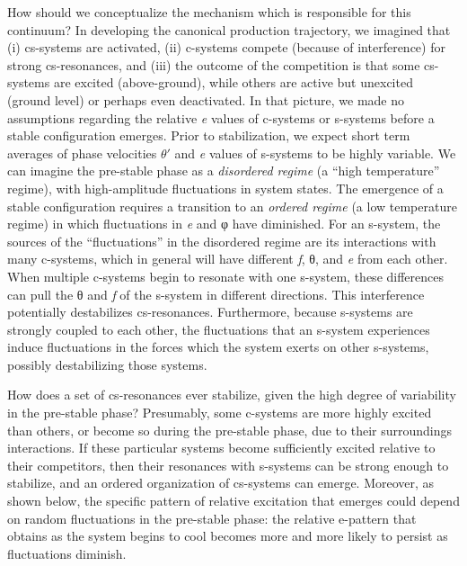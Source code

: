  How should we conceptualize the mechanism which is responsible for this continuum? In developing the canonical production trajectory, we imagined that (i) cs-systems are activated, (ii) c-systems compete (because of interference) for strong cs-resonances, and (iii) the outcome of the competition is that some cs-systems are excited (above-ground), while others are active but unexcited (ground level) or perhaps even deactivated. In that picture, we made no assumptions regarding the relative \textit{e} values of c-systems or s-systems before a stable configuration emerges. Prior to stabilization, we expect short term averages of phase velocities $\theta ′$ and \textit{e} values of s-systems to be highly variable. We can imagine the pre-stable phase as a \textit{disordered regime} (a “high temperature” regime), with high-amplitude fluctuations in system states. The emergence of a stable configuration requires a transition to an \textit{ordered regime} (a low temperature regime) in which fluctuations in \textit{e} and φ have diminished. For an s-system, the sources of the “fluctuations” in the disordered regime are its interactions with many c-systems, which in general will have different \textit{f}, θ, and \textit{e} from each other. When multiple c-systems begin to resonate with one s-system, these differences can pull the θ and \textit{f} of the s-system in different directions. This interference potentially destabilizes cs-resonances. Furthermore, because s-systems are strongly coupled to each other, the fluctuations that an s-system experiences induce fluctuations in the forces which the system exerts on other s-systems, possibly destabilizing those systems.

  How does a set of cs-resonances ever stabilize, given the high degree of variability in the pre-stable phase? Presumably, some c-systems are more highly excited than others, or become so during the pre-stable phase, due to their surroundings interactions. If these particular systems become sufficiently excited relative to their competitors, then their resonances with s-systems can be strong enough to stabilize, and an ordered organization of cs-systems can emerge. Moreover, as shown below, the specific pattern of relative excitation that emerges could depend on random fluctuations in the pre-stable phase: the relative e-pattern that obtains as the system begins to cool becomes more and more likely to persist as fluctuations diminish.

